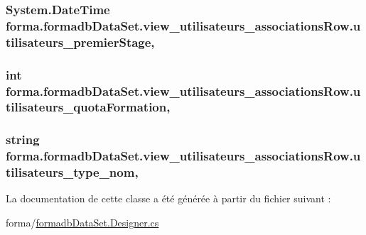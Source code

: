 \subsubsection[{\texorpdfstring{utilisateurs\+\_\+premier\+Stage}{utilisateurs_premierStage}}]{\setlength{\rightskip}{0pt plus 5cm}System.\+Date\+Time forma.\+formadb\+Data\+Set.\+view\+\_\+utilisateurs\+\_\+associations\+Row.\+utilisateurs\+\_\+premier\+Stage\hspace{0.3cm}{\ttfamily [get]}, {\ttfamily [set]}}\hypertarget{classforma_1_1formadb_data_set_1_1view__utilisateurs__associations_row_a5ee4911111c9a7af5d66c84bb1250dd7}{}\label{classforma_1_1formadb_data_set_1_1view__utilisateurs__associations_row_a5ee4911111c9a7af5d66c84bb1250dd7}
\subsubsection[{\texorpdfstring{utilisateurs\+\_\+quota\+Formation}{utilisateurs_quotaFormation}}]{\setlength{\rightskip}{0pt plus 5cm}int forma.\+formadb\+Data\+Set.\+view\+\_\+utilisateurs\+\_\+associations\+Row.\+utilisateurs\+\_\+quota\+Formation\hspace{0.3cm}{\ttfamily [get]}, {\ttfamily [set]}}\hypertarget{classforma_1_1formadb_data_set_1_1view__utilisateurs__associations_row_a4e1321079952569dbc12ffa6c8964ae9}{}\label{classforma_1_1formadb_data_set_1_1view__utilisateurs__associations_row_a4e1321079952569dbc12ffa6c8964ae9}
\subsubsection[{\texorpdfstring{utilisateurs\+\_\+type\+\_\+nom}{utilisateurs_type_nom}}]{\setlength{\rightskip}{0pt plus 5cm}string forma.\+formadb\+Data\+Set.\+view\+\_\+utilisateurs\+\_\+associations\+Row.\+utilisateurs\+\_\+type\+\_\+nom\hspace{0.3cm}{\ttfamily [get]}, {\ttfamily [set]}}\hypertarget{classforma_1_1formadb_data_set_1_1view__utilisateurs__associations_row_a0ab08c2fbdd4a4469359bddea8affcf1}{}\label{classforma_1_1formadb_data_set_1_1view__utilisateurs__associations_row_a0ab08c2fbdd4a4469359bddea8affcf1}


La documentation de cette classe a été générée à partir du fichier suivant \+:\begin{DoxyCompactItemize}
\item 
forma/\hyperlink{formadb_data_set_8_designer_8cs}{formadb\+Data\+Set.\+Designer.\+cs}\end{DoxyCompactItemize}
